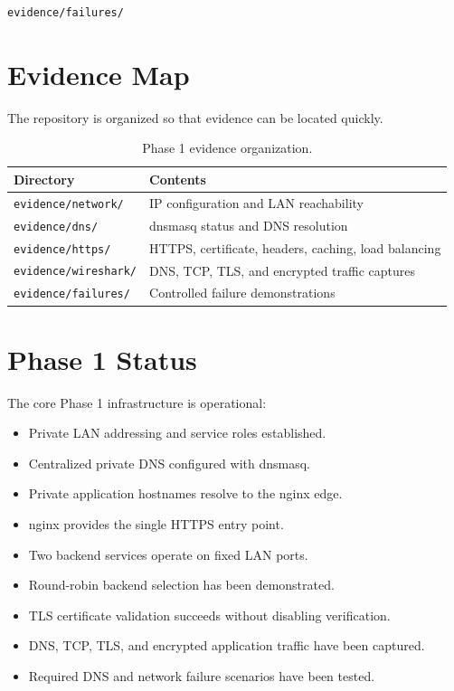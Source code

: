 \documentclass[11pt,a4paper]{article}
\begin{document}
\begin{lstlisting}
evidence/failures/
\end{lstlisting}

\section{Evidence Map}

The repository is organized so that evidence can be located quickly.

\begin{table}[H]
\centering
\begin{tabular}{p{3.2cm}p{8cm}}
\toprule
\textbf{Directory} & \textbf{Contents} \\
\midrule
\texttt{evidence/network/} & IP configuration and LAN reachability \\
\texttt{evidence/dns/} & dnsmasq status and DNS resolution \\
\texttt{evidence/https/} & HTTPS, certificate, headers, caching, load balancing \\
\texttt{evidence/wireshark/} & DNS, TCP, TLS, and encrypted traffic captures \\
\texttt{evidence/failures/} & Controlled failure demonstrations \\
\bottomrule
\end{tabular}
\caption{Phase 1 evidence organization.}
\end{table}

\section{Phase 1 Status}

The core Phase 1 infrastructure is operational:

\begin{itemize}
    \item Private LAN addressing and service roles established.
    \item Centralized private DNS configured with dnsmasq.
    \item Private application hostnames resolve to the nginx edge.
    \item nginx provides the single HTTPS entry point.
    \item Two backend services operate on fixed LAN ports.
    \item Round-robin backend selection has been demonstrated.
    \item TLS certificate validation succeeds without disabling verification.
    \item DNS, TCP, TLS, and encrypted application traffic have been captured.
    \item Required DNS and network failure scenarios have been tested.
\end{itemize}
\end{document}
